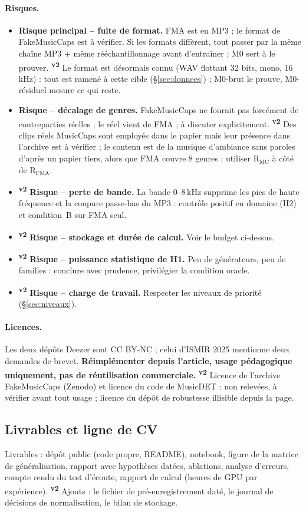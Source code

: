 \documentclass[11pt,a4paper]{article}
\newcommand{\vtwo}{\textsuperscript{\textcolor{orange!80!black}{\textbf{v2}}}}
\begin{document}
\paragraph{Risques.}
\begin{itemize}
\item \textbf{Risque principal -- fuite de format.} FMA est en MP3 ; le format de FakeMusicCaps est à vérifier. Si les formats diffèrent, tout passer par la même chaîne MP3 + même rééchantillonnage avant d'entraîner ; M0 sert à le prouver. \vtwo{} Le format est désormais connu (WAV flottant 32 bits, mono, 16\,kHz) : tout est ramené à cette cible (§\ref{sec:donnees}) ; M0-brut le prouve, M0-résiduel mesure ce qui reste.
\item \textbf{Risque -- décalage de genres.} FakeMusicCaps ne fournit pas forcément de contreparties réelles ; le réel vient de FMA ; à discuter explicitement. \vtwo{} Des clips réels MusicCaps sont employés dans le papier mais leur présence dans l'archive est à vérifier ; le contenu est de la musique d'ambiance sans paroles d'après un papier tiers, alors que FMA couvre 8 genres : utiliser R$_{\text{MC}}$ à côté de R$_{\text{FMA}}$.
\item \vtwo{} \textbf{Risque -- perte de bande.} La bande 0--8\,kHz supprime les pics de haute fréquence et la coupure passe-bas du MP3 : contrôle positif en domaine (H2) et condition~B sur FMA seul.
\item \vtwo{} \textbf{Risque -- stockage et durée de calcul.} Voir le budget ci-dessus.
\item \vtwo{} \textbf{Risque -- puissance statistique de H1.} Peu de générateurs, peu de familles : conclure avec prudence, privilégier la condition oracle.
\item \vtwo{} \textbf{Risque -- charge de travail.} Respecter les niveaux de priorité (§\ref{sec:niveaux}).
\end{itemize}

\paragraph{Licences.} Les deux dépôts Deezer sont CC BY-NC ; celui d'ISMIR 2025 mentionne deux demandes de brevet. \textbf{Réimplémenter depuis l'article, usage pédagogique uniquement, pas de réutilisation commerciale.} \vtwo{} Licence de l'archive FakeMusicCaps (Zenodo) et licence du code de MusicDET : non relevées, à vérifier avant tout usage ; licence du dépôt de robustesse illisible depuis la page.

\subsection{Livrables et ligne de CV}\label{sec:livrables}
Livrables : dépôt public (code propre, README), notebook, figure de la matrice de généralisation, rapport avec hypothèses datées, ablations, analyse d'erreurs, compte rendu du test d'écoute, rapport de calcul (heures de GPU par expérience). \vtwo{} Ajouts : le fichier de pré-enregistrement daté, le journal de décisions de normalisation, le bilan de stockage.
\end{document}
